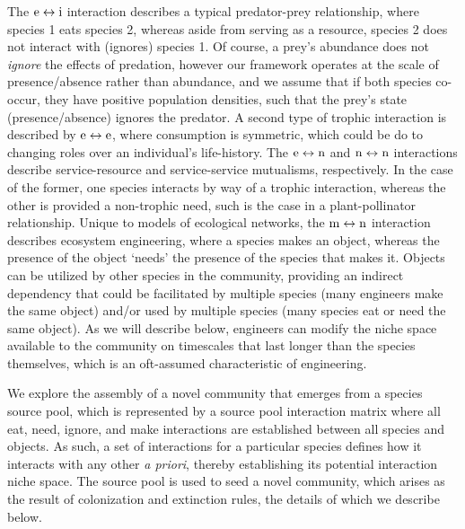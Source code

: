 \documentclass[twocolumn,preprintnumbers,amsmath,amssymb,superscriptaddress]{revtex4}
\newcommand{\rr}[1]{{\rm #1}}
\begin{document}
The $\rr{e} \leftrightarrow \rr{i}$ interaction describes a typical predator-prey relationship, where species 1 eats species 2, whereas aside from serving as a resource, species 2 does not interact with (ignores) species 1.
Of course, a prey's abundance does not \emph{ignore} the effects of predation, however our framework operates at the scale of presence/absence rather than abundance, and we assume that if both species co-occur, they have positive population densities, such that the prey's state (presence/absence) ignores the predator.
A second type of trophic interaction is described by $\rr{e} \leftrightarrow \rr{e}$, where consumption is symmetric, which could be do to changing roles over an individual's life-history.
The $\rr{e} \leftrightarrow \rr{n}$ and $\rr{n} \leftrightarrow \rr{n}$ interactions describe service-resource and service-service mutualisms, respectively.
In the case of the former, one species interacts by way of a trophic interaction, whereas the other is provided a non-trophic need, such is the case in a plant-pollinator relationship.
Unique to models of ecological networks, the $\rr{m} \leftrightarrow \rr{n}$ interaction describes ecosystem engineering, where a species makes an object, whereas the presence of the object `needs' the presence of the species that makes it.
Objects can be utilized by other species in the community, providing an indirect dependency that could be facilitated by multiple species (many engineers make the same object) and/or used by multiple species (many species eat or need the same object).
As we will describe below, engineers can modify the niche space available to the community on timescales that last longer than the species themselves, which is an oft-assumed characteristic of engineering.

We explore the assembly of a novel community that emerges from a species source pool, which is represented by a source pool interaction matrix where all eat, need, ignore, and make interactions are established between all species and objects.
As such, a set of interactions for a particular species defines how it interacts with any other \emph{a priori}, thereby establishing its potential interaction niche space.
The source pool is used to seed a novel community, which arises as the result of colonization and extinction rules, the details of which we describe below.
\end{document}
